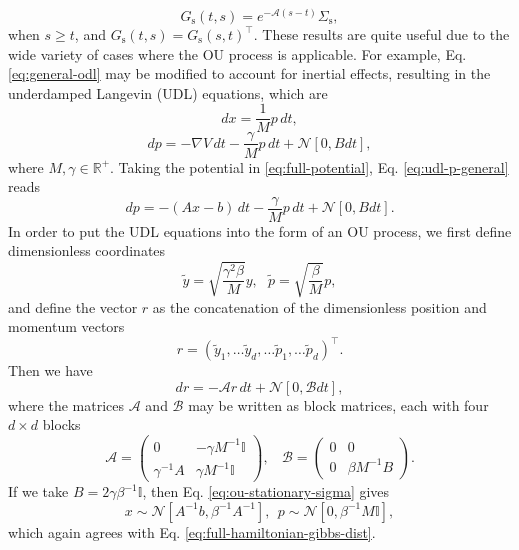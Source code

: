 \documentclass[prx,onecolumn,floatfix,longbibliography,notitlepage, nofootinbib]{revtex4-1}
\renewcommand{\geq}{\geqslant}
\begin{document}
\begin{appendix}
\begin{equation}
    G_\text{s}(t, s) = e^{-\mathcal{A} (s-t)}\Sigma_\text{s},
\end{equation}
when $s \geq t$, and $G_\text{s}(t,s) = G_\text{s}(s,t)^\intercal$. These results are quite useful due to the wide variety of cases where the OU process is applicable. For example, Eq. \eqref{eq:general-odl} may be modified to account for inertial effects, resulting in the underdamped Langevin (UDL) equations, which are
\begin{equation}
\label{eq:udl-x-general}
    dx  = \frac{1}{M} p \, dt,
\end{equation}
\begin{equation}
\label{eq:udl-p-general}
    dp = -\nabla V \, dt- \frac{\gamma}{M} p \, dt + \mathcal{N}[0,B dt],
\end{equation}
where $M, \gamma \in \mathbb{R}^+$. Taking the potential in \eqref{eq:full-potential}, Eq. \eqref{eq:udl-p-general} reads
\begin{equation}
\label{eq:udl-p-device}
    dp = -(A x - b)\, dt- \frac{\gamma}{M} p \, dt + \mathcal{N}[0,B dt].
\end{equation}
In order to put the UDL equations into the form of an OU process, we first define dimensionless coordinates
\begin{equation}
    \tilde{y} =\sqrt{\frac{\gamma^2 \beta}{M}}y, \: \: \: \tilde{p} = \sqrt{\frac{\beta}{M}}p,
\end{equation}
and define the vector $r$ as the concatenation of the dimensionless position and momentum vectors
\begin{equation}
\label{r-def-app}
    r = \left(\tilde{y}_1, \dots \tilde{y}_d, \dots \tilde{p}_1, \dots \tilde{p}_d\right)^\intercal.
\end{equation}
Then we have
\begin{equation}
    \label{UDL-vec}
    dr = -\mathcal{A} r\, dt + \mathcal{N}[0, \mathcal{B} dt],
\end{equation}
where the matrices $\mathcal{A}$ and $\mathcal{B}$ may be written as block matrices, each with four $d \times d$ blocks
\begin{equation}
    \mathcal{A} = \begin{pmatrix}
    0 & -\gamma M^{-1}\mathbb{I} \\
    \gamma^{-1}A & \gamma M^{-1} \mathbb{I}
    \end{pmatrix}, \: \: \: \:
    \mathcal{B} = \begin{pmatrix}
    0 & 0  \\
    0 & \beta M^{-1} B
    \end{pmatrix}.
\end{equation}
If we take $B = 2 \gamma \beta^{-1} \mathbb{I}$, then Eq. \eqref{eq:ou-stationary-sigma} gives
\begin{equation}
    x \sim \mathcal{N}[A^{-1}b, \beta^{-1}A^{-1}], \: \: p \sim  \mathcal{N}\left[0, \beta^{-1}M \mathbb{I}\right],
\end{equation}
which again agrees with Eq. \eqref{eq:full-hamiltonian-gibbs-dist}.





\end{appendix}
\end{document}
